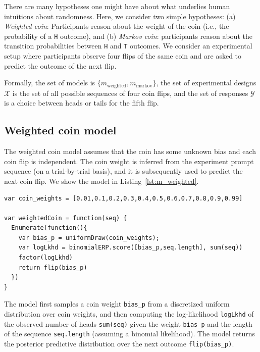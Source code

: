 \documentclass{article}
\begin{document}
There are many hypotheses one might have about what underlies human intuitions about randomness.
Here, we consider two simple hypotheses: (a) \emph{Weighted coin}: Participants reason about the weight of the coin (i.e., the probability of a \lstinline{H} outcome), and (b) \emph{Markov coin}: participants reason about the transition probabilities between \lstinline{H} and \lstinline{T} outcomes.
We consider an experimental setup where participants observe four flips of the same coin and are asked to predict the outcome of the next flip.

Formally, the set of models is $\{m_{\textrm{weighted}}, m_{\text{markov}}\}$, the set of experimental designs $\mathcal{X}$ is the set of all possible sequences of four coin flips, and the set of responses $\mathcal{Y}$ is a choice between heads or tails for the fifth flip.

\subsection{Weighted coin model}
\label{s:tutorial:sss:biased}

The weighted coin model assumes that the coin has some unknown bias and each coin flip is independent.
The coin weight is inferred from the experiment prompt sequence (on a trial-by-trial basis), and it is subsequently used to predict the next coin flip. We show the model in Listing~\ref{lst:m_weighted}.

\label{lst:m_weighted}
\begin{lstlisting}[caption=Biased coin model]
var coin_weights = [0.01,0.1,0.2,0.3,0.4,0.5,0.6,0.7,0.8,0.9,0.99]

var weightedCoin = function(seq) {
  Enumerate(function(){
    var bias_p = uniformDraw(coin_weights);
    var logLkhd = binomialERP.score([bias_p,seq.length], sum(seq))
    factor(logLkhd)
    return flip(bias_p)
  })
}
\end{lstlisting}
%
The model first samples a coin weight \lstinline{bias_p} from a discretized uniform distribution over coin weights, and then computing the log-likelihood \lstinline{logLkhd} of the observed number of heads \lstinline{sum(seq)} given the weight \lstinline{bias_p} and the length of the sequence \lstinline{seq.length} (assuming a binomial likelihood). The model returns the posterior predictive distribution over the next outcome \lstinline{flip(bias_p)}.
\end{document}
